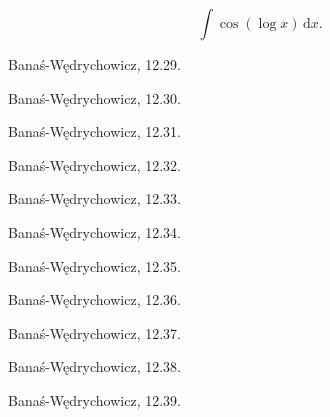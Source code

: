 \begin{problem}
    \label{banas_12_20}%
    \begin{equation}
        \int \cos(\log x) \, \mathrm{d}x.
    \end{equation}
\end{problem}    

\begin{problem}
    Banaś-Wędrychowicz, 12.29.
\end{problem}

\begin{problem}
    Banaś-Wędrychowicz, 12.30.
\end{problem}

\begin{problem}
    Banaś-Wędrychowicz, 12.31.
\end{problem}

\begin{problem}
    Banaś-Wędrychowicz, 12.32.
\end{problem}

\begin{problem}
    Banaś-Wędrychowicz, 12.33.
\end{problem}

\begin{problem}
    Banaś-Wędrychowicz, 12.34.
\end{problem}

\begin{problem}
    Banaś-Wędrychowicz, 12.35.
\end{problem}

\begin{problem}
    Banaś-Wędrychowicz, 12.36.
\end{problem}

\begin{problem}
    Banaś-Wędrychowicz, 12.37.
\end{problem}

\begin{problem}
    Banaś-Wędrychowicz, 12.38.
\end{problem}

\begin{problem}
    Banaś-Wędrychowicz, 12.39.
\end{problem}


